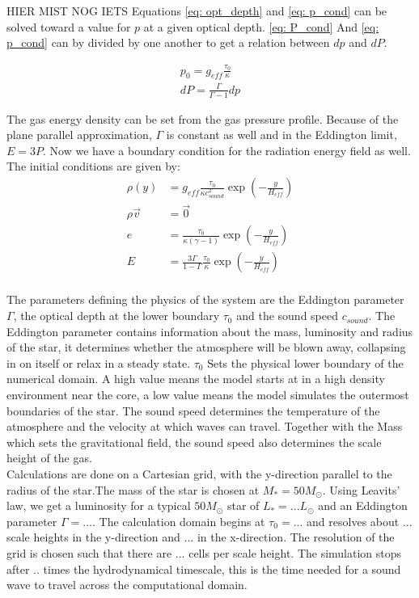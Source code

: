 HIER MIST NOG IETS
Equations \eqref{eq: opt_depth} and \eqref{eq: p_cond} can be solved toward a value for $p$ at a given optical depth. \eqref{eq: P_cond} And \eqref{eq: p_cond} can by divided by one another to get a relation between $dp$ and $dP$.

\begin{align}
p_0 = g_{eff} \frac{\tau_0}{\kappa} \\
dP = \frac{\Gamma}{\Gamma-1} dp
\end{align}

The gas energy density can be set from the gas pressure profile. Because of the plane parallel approximation, $\Gamma$ is constant as well and in the Eddington limit, $E=3P$. Now we have a boundary condition for the radiation energy field as well. The initial conditions are given by:
\begin{align}
\rho(y) &= g_{eff} \frac{\tau_0}{\kappa c_{sound}^2} \exp \left( -\frac{y}{H_{eff}} \right) \\
\rho \vec{v} &= \vec{0} \\
e &= \frac{\tau_0}{\kappa (\gamma - 1)} \exp \left( -\frac{y}{H_{eff}} \right) \\
E &= \frac{3 \Gamma}{1-\Gamma} \frac{\tau_0}{\kappa} \exp \left( -\frac{y}{H_{eff}} \right) \\
\end{align}

The parameters defining the physics of the system are the Eddington parameter $\Gamma$, the optical depth at the lower boundary $\tau_0$ and the sound speed $c_{sound}$. The Eddington parameter contains information about the mass, luminosity and radius of the star, it determines whether the atmosphere will be blown away, collapsing in on itself or relax in a steady state. $\tau_0$ Sets the physical lower boundary of the numerical domain. A high value means the model starts at in a high density environment near the core, a low value means the model simulates the outermost boundaries of the star. The sound speed determines the temperature of the atmosphere and the velocity at which waves can travel. Together with the Mass which sets the gravitational field, the sound speed also determines the scale height of the gas. \\

Calculations are done on a Cartesian grid, with the y-direction parallel to the radius of the star.The mass of the star is chosen at $M_* = 50 M_\odot$. Using Leavits' law, we get a luminosity for a typical $50M_\odot$ star of $L_* = ... L_\odot$ and an Eddington parameter $\Gamma = ...$. The calculation domain begins at $\tau_0 = ...$ and resolves about $...$ scale heights in the y-direction and $...$ in the x-direction. The resolution of the grid is chosen such that there are $...$ cells per scale height. The simulation stops after $..$ times the hydrodynamical timescale, this is the time needed for a sound wave to travel across the computational domain. 

